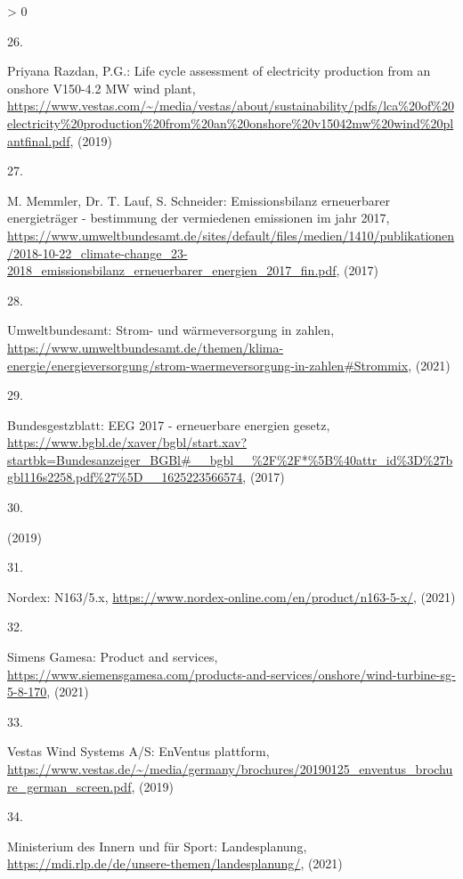 \documentclass[a4paper,11pt]{article}
\newlength{\cslhangindent}
\newlength{\csllabelwidth}
\newenvironment{CSLReferences}[3] %
 {%
  \setlength{\parindent}{0pt}
  \ifodd #1 \everypar{\setlength{\hangindent}{\cslhangindent}}\ignorespaces\fi
  \ifnum #2 > 0
  \setlength{\parskip}{#2\baselineskip}
  \fi
 }%
 {}
\newcommand{\CSLLeftMargin}[1]{\parbox[t]{\maxof{\widthof{#1}}{\csllabelwidth}}{#1}}
\newcommand{\CSLRightInline}[1]{\parbox[t]{\linewidth}{#1}}
\begin{document}
\begin{CSLReferences}{0}{0}
\leavevmode\hypertarget{ref-PriyanaRazdan.2019}{}%
\CSLLeftMargin{26. }
\CSLRightInline{Priyana Razdan, P.G.: Life cycle assessment of electricity production from an onshore V150-4.2 MW wind plant, \url{https://www.vestas.com/~/media/vestas/about/sustainability/pdfs/lca\%20of\%20electricity\%20production\%20from\%20an\%20onshore\%20v15042mw\%20wind\%20plantfinal.pdf}, (2019)}

\leavevmode\hypertarget{ref-M.MemmlerDr.T.LaufS.Schneider.2017}{}%
\CSLLeftMargin{27. }
\CSLRightInline{M. Memmler, Dr. T. Lauf, S. Schneider: Emissionsbilanz erneuerbarer energietr{ä}ger - bestimmung der vermiedenen emissionen im jahr 2017, \url{https://www.umweltbundesamt.de/sites/default/files/medien/1410/publikationen/2018-10-22_climate-change_23-2018_emissionsbilanz_erneuerbarer_energien_2017_fin.pdf}, (2017)}

\leavevmode\hypertarget{ref-Umweltbundesamt.2021}{}%
\CSLLeftMargin{28. }
\CSLRightInline{Umweltbundesamt: Strom- und w{ä}rmeversorgung in zahlen, \url{https://www.umweltbundesamt.de/themen/klima-energie/energieversorgung/strom-waermeversorgung-in-zahlen\#Strommix}, (2021)}

\leavevmode\hypertarget{ref-Bundesgestzblatt.2017}{}%
\CSLLeftMargin{29. }
\CSLRightInline{Bundesgestzblatt: EEG 2017 - erneuerbare energien gesetz, \url{https://www.bgbl.de/xaver/bgbl/start.xav?startbk=Bundesanzeiger_BGBl\#__bgbl__\%2F\%2F*\%5B\%40attr_id\%3D\%27bgbl116s2258.pdf\%27\%5D__1625223566574}, (2017)}

\leavevmode\hypertarget{ref-EnergieagenturRheinlandPfalz.2019}{}%
\CSLLeftMargin{30. }
\CSLRightInline{(2019)}

\leavevmode\hypertarget{ref-Nordex.2021}{}%
\CSLLeftMargin{31. }
\CSLRightInline{Nordex: N163/5.x, \url{https://www.nordex-online.com/en/product/n163-5-x/}, (2021)}

\leavevmode\hypertarget{ref-SimensGamesa.2021}{}%
\CSLLeftMargin{32. }
\CSLRightInline{Simens Gamesa: Product and services, \url{https://www.siemensgamesa.com/products-and-services/onshore/wind-turbine-sg-5-8-170}, (2021)}

\leavevmode\hypertarget{ref-VestasWindSystemsAS.2019}{}%
\CSLLeftMargin{33. }
\CSLRightInline{Vestas Wind Systems A/S: EnVentus plattform, \url{https://www.vestas.de/~/media/germany/brochures/20190125_enventus_brochure_german_screen.pdf}, (2019)}

\leavevmode\hypertarget{ref-MinisteriumdesInnernundfurSport.2021}{}%
\CSLLeftMargin{34. }
\CSLRightInline{Ministerium des Innern und für Sport: Landesplanung, \url{https://mdi.rlp.de/de/unsere-themen/landesplanung/}, (2021)}


\end{CSLReferences}
\end{document}

